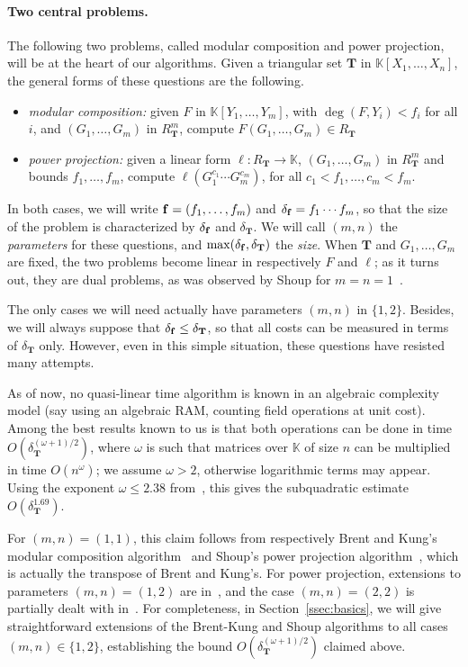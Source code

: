 \documentclass[12pt]{article}
\def\K {\ensuremath{\mathbb{K}}}
\def\Tt {\ensuremath{\mathbf{T}}}
\begin{document}
\paragraph{Two central problems.}
The following two problems, called modular composition and power
projection, will be at the heart of our algorithms.  Given a
triangular set $\Tt$ in $\K[X_1,\dots,X_n]$, the general forms of
these questions are the following.
\begin{itemize}
\item {\em modular composition:} given $F$ in $\K[Y_1,\dots,Y_m]$,
  with $\deg(F,Y_i) < f_i$ for all $i$, and $(G_1,\dots,G_m)$ in
  $R_\Tt^m$, compute $F(G_1,\dots,G_m) \in R_\Tt$
\item {\em power projection:} given a linear form $\ell:R_\Tt \to \K$,
  $(G_1,\dots,G_m)$ in $R_\Tt^m$ and bounds $f_1,\dots,f_m$, compute
  $\ell(G_1^{c_1}\cdots G_m^{c_m})$, for all $c_1 < f_1,\dots,c_m <
  f_m$.
\end{itemize}
In both cases, we will write ${\bf f}=(f_1,\dots,f_m)$ and
$\delta_{\bf f}=f_1\cdots f_m$, so that the size of the problem is
characterized by $\delta_{\bf f}$ and $\delta_\Tt$. We will call
$(m,n)$ the {\em parameters} for these questions, and
$\max(\delta_{\bf f},\delta_\Tt)$ the {\em size}. When $\Tt$ and
$G_1,\dots,G_m$ are fixed, the two problems become linear in
respectively $F$ and $\ell$; as it turns out, they are dual problems,
as was observed by Shoup for $m=n=1$~\cite{Shoup94}.

The only cases we will need actually have parameters $(m,n)$ in
$\{1,2\}$.  Besides, we will always suppose that $\delta_{\bf f} \le
\delta_\Tt$, so that all costs can be measured in terms of
$\delta_\Tt$ only. However, even in this simple situation, these
questions have resisted many attempts.

As of now, no quasi-linear time algorithm is known in an algebraic
complexity model (say using an algebraic RAM, counting field
operations at unit cost). Among the best results known to us is that
both operations can be done in time $O(\delta_\Tt^{(\omega+1)/2})$,
where $\omega$ is such that matrices over $\K$ of size $n$ can be
multiplied in time $O(n^\omega)$; we assume $\omega > 2$, otherwise
logarithmic terms may appear. Using the exponent $\omega \le 2.38$
from~\cite{CoWi90}, this gives the subquadratic estimate
$O(\delta_\Tt^{1.69})$.

For $(m,n)=(1,1)$, this claim follows from respectively Brent and
Kung's modular composition algorithm~\cite{BrKu78} and Shoup's power
projection algorithm~\cite{Shoup94}, which is actually the transpose
of Brent and Kung's. For power projection, extensions to parameters
$(m,n)=(1,2)$ are in~\cite{Shoup99,Kaltofen00,BoFlSaSc06}, and the
case $(m,n)=(2,2)$ is partially dealt with in~\cite{PaSc06}. For
completeness, in Section~\ref{ssec:basics}, we will give
straightforward extensions of the Brent-Kung and Shoup algorithms to
all cases $(m,n) \in \{1,2\}$, establishing the bound
$O(\delta_\Tt^{(\omega+1)/2})$ claimed above.
\end{document}
